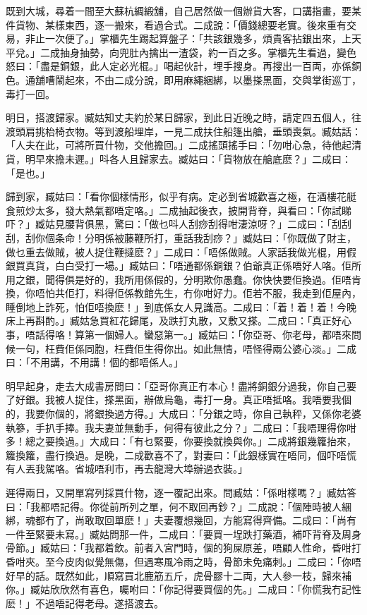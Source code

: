 \documentclass[a5paper, 12pt, openany]{book} %
\begin{document}
	既到大城，尋着一間至大蘇杭綢緞舖，自己居然做一個辦貨大客，口講指畫，要某件貨物、某樣東西，逐一搬來，看過合式。二成說：「價錢總要老實。後來重有交易，非止一次便了。」掌櫃先生踢起算盤子：「共該銀幾多，煩貴客拈銀出來，上天平兌。」二成抽身抽勢，向兜肚內擒出一渣袋，約一百之多。掌櫃先生看過，變色怒曰：「盡是銅銀，此人定必光棍。」喝起伙計，埋手搜身。再搜出一百両，亦係銅色。通舖嘈鬧起來，不由二成分說，即用麻繩綑綁，以墨搽黑面，交與掌街巡丁，毒打一回。

	明日，搭渡歸家。臧姑知丈夫約於某日歸家，到此日近晚之時，請定四五個人，往渡頭肩挑枱椅衣物。等到渡船埋岸，一見二成扶住船篷出艙，垂頭喪氣。臧姑話：「人夫在此，可將所買什物，交他擔回。」二成搖頭搖手曰：「勿咁心急，待他起清貨，明早來擔未遲。」呌各人且歸家去。臧姑曰：「貨物放在艙底麽？」二成曰：「是也。」

	歸到家，臧姑曰：「看你個樣情形，似乎有病。定必到省城歡喜之極，在酒樓花艇食煎炒太多，發大熱氣都唔定咯。」二成抽起後衣，披開背脊，與看曰：「你試睇吓？」臧姑見腰背俱黑，驚曰：「做乜呌人刮痧刮得咁淒涼呀？」二成曰：「刮刮刮，刮你個条命！分明係被藤鞭所打，重話我刮痧？」臧姑曰：「你既做了財主，做乜重去做賊，被人捉住鞭撻麽？」二成曰：「唔係做賊。人家話我做光棍，用假銀買真貨，白白受打一場。」臧姑曰：「唔通都係銅銀？伯爺真正係唔好人咯。佢所用之銀，聞得俱是好的，我所用係假的，分明欺你愚蠢。你快快要佢換過。佢唔肯換，你唔怕共佢打，料得佢係教館先生，冇你咁好力。佢若不服，我走到佢屋內，睡倒地上詐死，怕佢唔換麽！」到底係女人見識高。二成曰：「着！着！着！今晚床上再斟酌。」臧姑急買紅花歸尾，及跌打丸散，又敷又搽。二成曰：「真正好心事，唔話得咯！算第一個婦人。蠻惡第一。」臧姑曰：「你亞哥、你老母，都唔來問候一句，枉費佢係同胞，枉費佢生得你出。如此無情，唔怪得兩公婆心淡。」二成曰：「不用講，不用講！個的都唔係人。」

	明早起身，走去大成書房問曰：「亞哥你真正冇本心！盡將銅銀分過我，你自己要了好銀。我被人捉住，搽黑面，辦做烏龜，毒打一身。真正唔抵咯。我唔要我個的，我要你個的，將銀換過方得。」大成曰：「分銀之時，你自己執秤，又係你老婆執篸，手扒手捧。我夫妻並無動手，何得有彼此之分？」二成曰：「我唔理得你咁多！總之要換過。」大成曰：「有乜緊要，你要換就換與你。」二成將銀幾籮抬來，籮換籮，盡行換過。是晚，二成歡喜不了，對妻曰：「此銀樣實在唔同，個吓唔慌有人丟我駕咯。省城唔利市，再去龍灣大埠辦過衣裝。」

	遲得兩日，又開單寫列採買什物，逐一覆記出來。問臧姑：「係咁樣嗎？」臧姑答曰：「我都唔記得。你從前所列之單，何不取回再鈔？」二成說：「個陣時被人綑綁，魂都冇了，尚敢取回單麽！」夫妻覆想幾回，方能寫得齊備。二成曰：「尚有一件至緊要未寫。」臧姑問那一件，二成曰：「要買一埕跌打藥酒，補吓背脊及周身骨節。」臧姑曰：「我都着飲。前者入宮門時，個的狗屎原差，唔顧人性命，昏咁打昏咁夾。至今皮肉似覺無傷，但遇寒風冷雨之時，骨節未免痛刺。」二成曰：「你唔好早的話。既然如此，順寫買北鹿筋五斤，虎骨膠十二両，大人參一枝，歸來補你。」臧姑欣欣然有喜色，囑咐曰：「你記得要買個的先。」二成曰：「你慌我冇記性麽！」不過唔記得老母。遂搭渡去。
\end{document}
